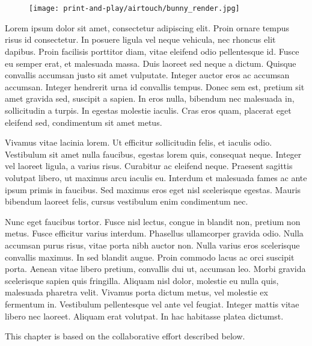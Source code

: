 \chapter{\bh} \label{ch:blowhole}
  \begin{figure}[h]
    \centering
    \texttt{[image: print-and-play/airtouch/bunny\_render.jpg]}
  \end{figure}

  Lorem ipsum dolor sit amet, consectetur adipiscing elit. Proin ornare tempus
  risus id consectetur. In posuere ligula vel neque vehicula, nec rhoncus elit
  dapibus. Proin facilisis porttitor diam, vitae eleifend odio pellentesque id.
  Fusce eu semper erat, et malesuada massa. Duis laoreet sed neque a dictum.
  Quisque convallis accumsan justo sit amet vulputate. Integer auctor eros ac
  accumsan accumsan. Integer hendrerit urna id convallis tempus. Donec sem est,
  pretium sit amet gravida sed, suscipit a sapien. In eros nulla, bibendum nec
  malesuada in, sollicitudin a turpis. In egestas molestie iaculis. Cras eros
  quam, placerat eget eleifend sed, condimentum sit amet metus.

  Vivamus vitae lacinia lorem. Ut efficitur sollicitudin felis, et iaculis odio.
  Vestibulum sit amet nulla faucibus, egestas lorem quis, consequat neque.
  Integer vel laoreet ligula, a varius risus. Curabitur ac eleifend neque.
  Praesent sagittis volutpat libero, ut maximus arcu iaculis eu. Interdum et
  malesuada fames ac ante ipsum primis in faucibus. Sed maximus eros eget nisl
  scelerisque egestas. Mauris bibendum laoreet felis, cursus vestibulum enim
  condimentum nec.

  Nunc eget faucibus tortor. Fusce nisl lectus, congue in blandit non, pretium
  non metus. Fusce efficitur varius interdum. Phasellus ullamcorper gravida
  odio. Nulla accumsan purus risus, vitae porta nibh auctor non. Nulla varius
  eros scelerisque convallis maximus. In sed blandit augue. Proin commodo lacus
  ac orci suscipit porta. Aenean vitae libero pretium, convallis dui ut,
  accumsan leo. Morbi gravida scelerisque sapien quis fringilla. Aliquam nisl
  dolor, molestie eu nulla quis, malesuada pharetra velit. Vivamus porta dictum
  metus, vel molestie ex fermentum in. Vestibulum pellentesque vel ante vel
  feugiat. Integer mattis vitae libero nec laoreet. Aliquam erat volutpat. In
  hac habitasse platea dictumst.

  \newpage

  This chapter is based on the collaborative effort described below.

